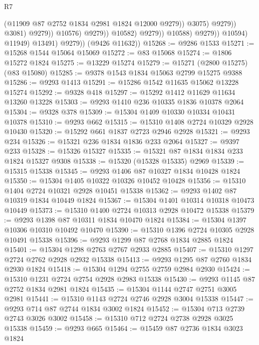 \begin{lexlean}{R7}
\begin{coremodule}
                                                (@11909 @87 @2752 @1834 @2981 @1824 @12000 @9279))
                                              @3075)
                                            @9279))
                                        @3081)
                                      @9279))
                                  @10576)
                                @9279))
                            @10582)
                          @9279))
                      @10588)
                    @9279))
                @10594)
              @11949)
            @13491)
          @9279))
      (@9426 @11632))
@15268 := @9286 @1533
@15271 := @15268 @1544 @15064 @15069
@15272 := @83 @15068
@15274 := @1806 @15272 @1824
@15275 := @13229 @15274
@15279 := @15271 (@2800 @15275) (@83 @15080)
@15285 := @9378 @1543 @1834 @15063 @2799 @15275 @9388
@15286 := @9293 @1413
@15291 := @15286 @1542 @11635 @15062 @13228 @15274
@15292 := @9328 @418
@15297 := @15292 @1412 @11629 @11634 @13260 @13228
@15303 := @9293 @1410 @236 @10335 @1836 @10378 @2064
@15304 := @9328 @378
@15309 := @15304 @1409 @10330 @10334 @10431 @10378
@15310 := @9293 @662
@15315 := @15310 @1408 @2724 @10329 @2928 @10430
@15320 := @15292 @661 @1837 @2723 @2946 @2928
@15321 := @9293 @234
@15326 := @15321 @236 @1834 @1836 @233 @2064
@15327 := @9397 @233
@15328 := @15326 @15327
@15335 := @15321 @87 @1834 @1834 @233 @1824 @15327 @9308
@15338 := @15320 (@15328 @15335) @2969
@15339 := @15315 @15338
@15345 := @9293 @1406 @87 @10327 @1834 @10428 @1824
@15350 := @15304 @1405 @10322 @10326 @10452 @10428
@15356 := @15310 @1404 @2724 @10321 @2928 @10451 @15338
@15362 := @9293 @1402 @87 @10319 @1834 @10449 @1824
@15367 := @15304 @1401 @10314 @10318 @10473 @10449
@15373 := @15310 @1400 @2724 @10313 @2928 @10472 @15338
@15379 := @9293 @1398 @87 @10311 @1834 @10470 @1824
@15384 := @15304 @1397 @10306 @10310 @10492 @10470
@15390 := @15310 @1396 @2724 @10305 @2928 @10491 @15338
@15396 := @9293 @1299 @87 @2768 @1834 @2885 @1824
@15401 := @15304 @1298 @2763 @2767 @2933 @2885
@15407 := @15310 @1297 @2724 @2762 @2928 @2932 @15338
@15413 := @9293 @1295 @87 @2760 @1834 @2930 @1824
@15418 := @15304 @1294 @2755 @2759 @2984 @2930
@15424 := @15310 @1231 @2724 @2754 @2928 @2983 @15338
@15430 := @9293 @1145 @87 @2752 @1834 @2981 @1824
@15435 := @15304 @1144 @2747 @2751 @3005 @2981
@15441 := @15310 @1143 @2724 @2746 @2928 @3004 @15338
@15447 := @9293 @714 @87 @2744 @1834 @3002 @1824
@15452 := @15304 @713 @2739 @2743 @3026 @3002
@15458 := @15310 @712 @2724 @2738 @2928 @3025 @15338
@15459 := @9293 @665
@15464 := @15459 @87 @2736 @1834 @3023 @1824

\end{coremodule}
\end{lexlean}
